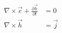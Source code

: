 \begin{equation}
\begin{split}
    \nabla \times \vec{e} + \frac{\partial \vec{b}}{\partial t} &= 0 \\
    \nabla \times \vec{h}  &= \vec{j}
\end{split}
\label{eq:maxwell_time_quasi}
\end{equation}
